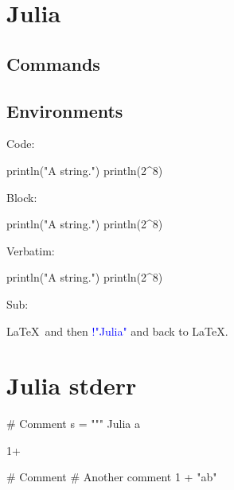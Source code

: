 \documentclass[11pt]{article}
\begin{document}
\section*{Julia}

\subsection*{Commands}




\printpythontex




\subsection*{Environments}

Code:
\begin{juliacode}
println("A string.")
println(2^8)
\end{juliacode}

Block:
\begin{juliablock}
println("A string.")
println(2^8)
\end{juliablock}

\printpythontex

Verbatim:
\begin{juliaverbatim}
println("A string.")
println(2^8)
\end{juliaverbatim}

Sub:
\begin{juliasub}
\LaTeX\ and then \textcolor{blue}{!{"Julia"}} and back to \LaTeX.
\end{juliasub}


\section*{Julia stderr}


\begin{juliablock}[err1][numbers=left]
# Comment
s = """
    Julia a
\end{juliablock}

\stderrpythontex[][breaklines, breakafter=\\/]

\begin{juliablock}[err2][numbers=left]
1+
\end{juliablock}

\stderrpythontex[][breaklines, breakafter=\\/]

\begin{juliablock}[err3][numbers=left]
# Comment
# Another comment
1 + "ab"
\end{juliablock}

\stderrpythontex[][breaklines, breakafter=\\/]
\end{document}

